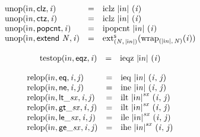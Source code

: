 $$
\begin{array}{@{}lcl@{}l@{}}
{\mathrm{unop}}({\mathsf{i}}{{\mathit{n}}}, \mathsf{clz}, {\mathit{i}}) &=& {\mathrm{iclz}}~{|{\mathsf{i}}{{\mathit{n}}}|}~({\mathit{i}}) &  \\
{\mathrm{unop}}({\mathsf{i}}{{\mathit{n}}}, \mathsf{ctz}, {\mathit{i}}) &=& {\mathrm{iclz}}~{|{\mathsf{i}}{{\mathit{n}}}|}~({\mathit{i}}) &  \\
{\mathrm{unop}}({\mathsf{i}}{{\mathit{n}}}, \mathsf{popcnt}, {\mathit{i}}) &=& {\mathrm{ipopcnt}}~{|{\mathsf{i}}{{\mathit{n}}}|}~({\mathit{i}}) &  \\
{\mathrm{unop}}({\mathsf{i}}{{\mathit{n}}}, \mathsf{extend}~{\mathit{N}}, {\mathit{i}}) &=& {{{{\mathrm{ext}}}_{({\mathit{N}},\, {|{\mathsf{i}}{{\mathit{n}}}|})}^{\mathsf{s}}}}{({{{\mathrm{wrap}}}_{({|{\mathsf{i}}{{\mathit{n}}}|},\, {\mathit{N}})}}{({\mathit{i}})})} &  \\
\end{array}
$$

$$
\begin{array}{@{}lcl@{}l@{}}
{\mathrm{testop}}({\mathsf{i}}{{\mathit{n}}}, \mathsf{eqz}, {\mathit{i}}) &=& {\mathrm{ieqz}}~{|{\mathsf{i}}{{\mathit{n}}}|}~({\mathit{i}}) &  \\
\end{array}
$$

$$
\begin{array}{@{}lcl@{}l@{}}
{\mathrm{relop}}({\mathsf{i}}{{\mathit{n}}}, \mathsf{eq}, {\mathit{i}}, {\mathit{j}}) &=& {\mathrm{ieq}}~{|{\mathsf{i}}{{\mathit{n}}}|}~({\mathit{i}},\, {\mathit{j}}) &  \\
{\mathrm{relop}}({\mathsf{i}}{{\mathit{n}}}, \mathsf{ne}, {\mathit{i}}, {\mathit{j}}) &=& {\mathrm{ine}}~{|{\mathsf{i}}{{\mathit{n}}}|}~({\mathit{i}},\, {\mathit{j}}) &  \\
{\mathrm{relop}}({\mathsf{i}}{{\mathit{n}}}, {\mathsf{lt\_}}{{\mathit{sx}}}, {\mathit{i}}, {\mathit{j}}) &=& {\mathrm{ilt}}~{{|{\mathsf{i}}{{\mathit{n}}}|}^{{\mathit{sx}}}}~({\mathit{i}},\, {\mathit{j}}) &  \\
{\mathrm{relop}}({\mathsf{i}}{{\mathit{n}}}, {\mathsf{gt\_}}{{\mathit{sx}}}, {\mathit{i}}, {\mathit{j}}) &=& {\mathrm{ilt}}~{{|{\mathsf{i}}{{\mathit{n}}}|}^{{\mathit{sx}}}}~({\mathit{i}},\, {\mathit{j}}) &  \\
{\mathrm{relop}}({\mathsf{i}}{{\mathit{n}}}, {\mathsf{le\_}}{{\mathit{sx}}}, {\mathit{i}}, {\mathit{j}}) &=& {\mathrm{ile}}~{{|{\mathsf{i}}{{\mathit{n}}}|}^{{\mathit{sx}}}}~({\mathit{i}},\, {\mathit{j}}) &  \\
{\mathrm{relop}}({\mathsf{i}}{{\mathit{n}}}, {\mathsf{ge\_}}{{\mathit{sx}}}, {\mathit{i}}, {\mathit{j}}) &=& {\mathrm{ihe}}~{{|{\mathsf{i}}{{\mathit{n}}}|}^{{\mathit{sx}}}}~({\mathit{i}},\, {\mathit{j}}) &  \\
\end{array}
$$

